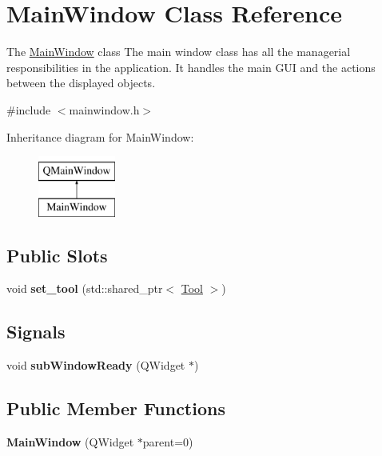 \hypertarget{classMainWindow}{}\section{Main\+Window Class Reference}
\label{classMainWindow}


The \mbox{\hyperlink{classMainWindow}{Main\+Window}} class The main window class has all the managerial responsibilities in the application. It handles the main G\+UI and the actions between the displayed objects.  




{\ttfamily \#include $<$mainwindow.\+h$>$}

Inheritance diagram for Main\+Window\+:\begin{figure}[H]
\begin{center}
\leavevmode
\includegraphics[height=2.000000cm]{classMainWindow}
\end{center}
\end{figure}
\subsection*{Public Slots}
\begin{DoxyCompactItemize}
\item 
\mbox{\label{classMainWindow_a045c3743032b6a84784279d4c9d9bd77}} 
void {\bfseries set\+\_\+tool} (std\+::shared\+\_\+ptr$<$ \mbox{\hyperlink{classTool}{Tool}} $>$)
\end{DoxyCompactItemize}
\subsection*{Signals}
\begin{DoxyCompactItemize}
\item 
\mbox{\label{classMainWindow_aad224a9b6fa5706eb6bc5bea8ad0ce86}} 
void {\bfseries sub\+Window\+Ready} (Q\+Widget $\ast$)
\end{DoxyCompactItemize}
\subsection*{Public Member Functions}
\begin{DoxyCompactItemize}
\item 
\mbox{\label{classMainWindow_a8b244be8b7b7db1b08de2a2acb9409db}} 
{\bfseries Main\+Window} (Q\+Widget $\ast$parent=0)
\end{DoxyCompactItemize}
